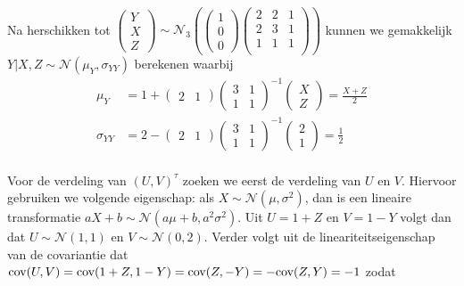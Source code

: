 \documentclass[a4paper,dutch,11pt,]{scrartcl}
\begin{document}
\paragraph{}
Na herschikken tot $\begin{pmatrix} Y \\ X \\Z \end{pmatrix} \sim \mathcal{N}_3( \begin{pmatrix} 1 \\ 0 \\ 0 \end{pmatrix} 
\begin{pmatrix}
2  & 2 & 1\\
2 & 3 & 1 \\
1 & 1 & 1 \\
\end{pmatrix})$ kunnen we gemakkelijk $Y|X,Z \sim \mathcal{N}(\mu_Y,\sigma_{YY})$ berekenen waarbij
\begin{align*}
 \mu_Y &= 1 + \begin{pmatrix} 2 & 1 \end{pmatrix} \begin{pmatrix} 3 & 1 \\ 1 & 1 \end{pmatrix}^{-1} \begin{pmatrix} X \\ Z \end{pmatrix} = \frac{X+Z}{2}\\
 \sigma_{YY} &= 2 - \begin{pmatrix} 2 & 1 \end{pmatrix} \begin{pmatrix} 3 & 1 \\ 1 & 1 \end{pmatrix}^{-1} \begin{pmatrix} 2 \\ 1 \end{pmatrix} = \frac{1}{2}
\end{align*}

\paragraph{}
Voor de verdeling van $(U,V)^\tau$ zoeken we eerst de verdeling van $U$ en $V$. Hiervoor gebruiken we volgende eigenschap: als $X\sim \mathcal{N}(\mu, \sigma^2)$, dan is een lineaire transformatie $aX+b \sim \mathcal{N}(a\mu + b,a^2\sigma^2)$.
Uit $U = 1 +Z$ en $V = 1- Y$ volgt dan dat $U\sim\mathcal{N}(1,1)$ en $V\sim\mathcal{N}(0,2)$. Verder volgt uit de lineariteitseigenschap van de covariantie dat $\textnormal{cov}(U,V)=\textnormal{cov}(1+Z,1-Y)=\textnormal{cov}(Z,-Y)=-\textnormal{cov}(Z,Y)=-1$ zodat
\end{document}
